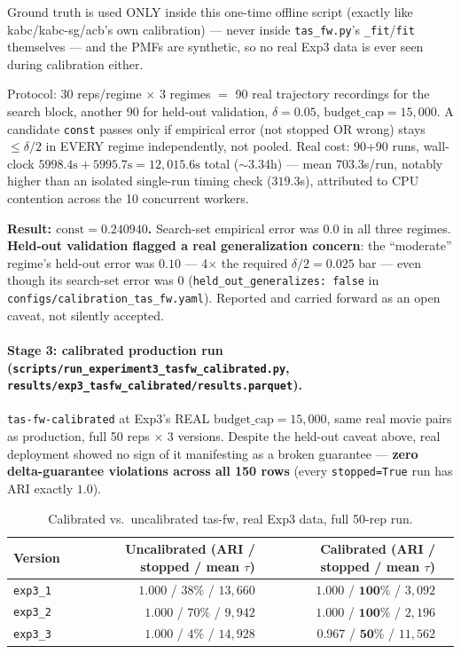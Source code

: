 \documentclass[11pt]{article}
\begin{document}
Ground truth is used ONLY inside this one-time offline script (exactly
like kabc/kabc-sg/acb's own calibration) --- never inside \texttt{tas\_fw.py}'s
\texttt{\_fit}/\texttt{fit} themselves --- and the PMFs are synthetic, so
no real Exp3 data is ever seen during calibration either.

Protocol: 30 reps/regime $\times$ 3 regimes $=$ 90 real trajectory
recordings for the search block, another 90 for held-out validation,
$\delta=0.05$, $\text{budget\_cap}=15{,}000$. A candidate \texttt{const}
passes only if empirical error (not stopped OR wrong) stays
$\le\delta/2$ in EVERY regime independently, not pooled. Real cost: 90+90
runs, wall-clock $5998.4\text{s} + 5995.7\text{s} = 12{,}015.6\text{s}$
total ($\sim$3.34h) --- mean $703.3$s/run, notably higher than an isolated
single-run timing check ($319.3$s), attributed to CPU contention across
the 10 concurrent workers.

\textbf{Result: $\text{const}=0.240940$.} Search-set empirical error was
$0.0$ in all three regimes. \textbf{Held-out validation flagged a real
generalization concern}: the ``moderate'' regime's held-out error was
$0.10$ --- 4$\times$ the required $\delta/2=0.025$ bar --- even though its
search-set error was $0$ (\texttt{held\_out\_generalizes: false} in
\texttt{configs/calibration\_tas\_fw.yaml}). Reported and carried forward
as an open caveat, not silently accepted.

\paragraph{Stage 3: calibrated production run
(\texttt{scripts/run\_experiment3\_tasfw\_calibrated.py},
\texttt{results/exp3\_tasfw\_calibrated/results.parquet}).}
\texttt{tas-fw-calibrated} at Exp3's REAL $\text{budget\_cap}=15{,}000$,
same real movie pairs as production, full 50 reps $\times$ 3 versions.
Despite the held-out caveat above, real deployment showed no sign of it
manifesting as a broken guarantee --- \textbf{zero delta-guarantee
violations across all 150 rows} (every \texttt{stopped=True} run has ARI
exactly $1.0$).

\begin{table}[h]
\centering
\small
\begin{tabular}{lrrr}
\toprule
Version & Uncalibrated (ARI / stopped / mean $\tau$) & Calibrated (ARI / stopped / mean $\tau$) \\
\midrule
\texttt{exp3\_1} & $1.000$ / $38\%$ / $13{,}660$ & $1.000$ / $\mathbf{100\%}$ / $3{,}092$ \\
\texttt{exp3\_2} & $1.000$ / $70\%$ / $9{,}942$ & $1.000$ / $\mathbf{100\%}$ / $2{,}196$ \\
\texttt{exp3\_3} & $1.000$ / $4\%$ / $14{,}928$ & $\mathbf{0.967}$ / $\mathbf{50\%}$ / $11{,}562$ \\
\bottomrule
\end{tabular}
\caption{Calibrated vs.\ uncalibrated tas-fw, real Exp3 data, full 50-rep run.}
\end{table}
\end{document}
